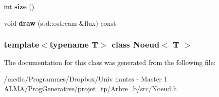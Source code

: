 \begin{DoxyCompactItemize}
\item 
\hypertarget{classNoeud_aa4d7f22c303c08ce8848087e3594aaa6}{
int {\bfseries size} ()}
\label{classNoeud_aa4d7f22c303c08ce8848087e3594aaa6}

\item 
\hypertarget{classNoeud_a14192544a21e81363cbf3ed6a58aa28b}{
void {\bfseries draw} (std::ostream \&flux) const }
\label{classNoeud_a14192544a21e81363cbf3ed6a58aa28b}

\end{DoxyCompactItemize}
\subsubsection*{template$<$typename T$>$ class Noeud$<$ T $>$}



The documentation for this class was generated from the following file:\begin{DoxyCompactItemize}
\item 
/media/Programmes/Dropbox/Univ nantes -\/ Master 1 ALMA/ProgGenerative/projet\_\-tp/Arbre\_\-b/src/Noeud.h\end{DoxyCompactItemize}
